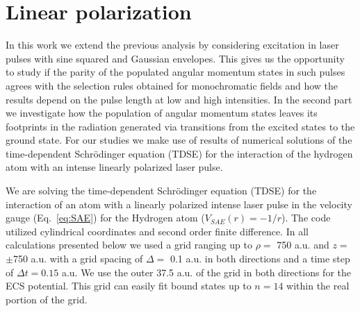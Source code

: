 \section{Linear polarization} %
\label{sec:linear_polarization}

In this work we extend the previous analysis by considering excitation in laser pulses with sine squared and Gaussian envelopes. This gives us the opportunity to study if the parity of the populated angular momentum states in such pulses agrees with the selection rules obtained for monochromatic fields and how the results depend on the pulse length at low and high intensities. In the second part we investigate how the population of angular momentum states leaves its footprints in the radiation generated via transitions from the excited states to the ground state. For our studies we make use of results of numerical solutions of the time-dependent Schr\"odinger equation (TDSE) for the interaction of the hydrogen atom with an intense linearly polarized laser pulse.


We are solving the time-dependent Schr\"{o}dinger equation (TDSE) for the interaction of an atom with a linearly polarized intense laser pulse in the velocity gauge (Eq.~\ref{eq:SAE}) for the Hydrogen atom ($V_{SAE}(r)=-1/r$). The code utilized cylindrical coordinates and second order finite difference. In all calculations presented below we used a grid ranging up to $\rho=$ 750 a.u. and $z=$ $\pm$750 a.u. with a grid spacing of $\Delta =$ 0.1 a.u. in both directions and a time step of $\Delta t = 0.15$ a.u. We use the outer 37.5 a.u. of the grid in both directions for the ECS potential. This grid can easily fit bound states up to $n = 14$ within the real portion of the grid. 

